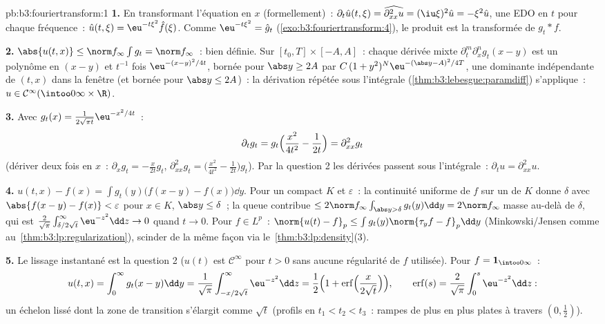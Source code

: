 \begin{solution}{pb:b3:fouriertransform:1}
\textbf{1.} En transformant l'équation en $x$
(formellement)~: $\partial_t\hat u(t,\xi) =
\widehat{\partial^2_{xx}u} = (\iu\xi)^2\hat u = -\xi^2\hat
u$, une EDO en $t$ pour chaque fréquence~: $\hat u(t,\xi) =
\eu^{-t\xi^2}\hat f(\xi)$. Comme $\eu^{-t\xi^2} = \hat g_t$
(\cref{exo:b3:fouriertransform:4}), le produit est la
transformée de $g_t * f$.

\textbf{2.} $\abs{u(t,x)} \leq \norm f_\infty\int g_t = \norm
f_\infty$~: bien définie. Sur $[t_0, T]\times[-A, A]$~: chaque
dérivée mixte $\partial^m_t\partial^n_xg_t(x - y)$ est un
polynôme en $(x - y)$ et $t^{-1}$ fois
$\eu^{-(x-y)^2/4t}$, bornée pour $\abs y \geq 2A$ par
$C\,(1 + y^2)^N\eu^{-(\abs y - A)^2/4T}$, une dominante
 indépendante de $(t, x)$ dans la fenêtre (et
bornée pour $\abs y \leq 2A$)~: la dérivation répétée sous
l'intégrale (\cref{thm:b3:lebesgue:paramdiff}) s'applique~:
$u \in \mathcal C^\infty(\intoo0\infty\times\R)$.

\textbf{3.} Avec $g_t(x) = \frac1{2\sqrt{\pi
t}}\eu^{-x^2/4t}$~:
\[
\partial_tg_t = g_t\Bigl(\frac{x^2}{4t^2} - \frac1{2t}\Bigr)
= \partial^2_{xx}g_t
\]
(dériver deux fois en $x$~: $\partial_xg_t = -\frac
x{2t}g_t$, $\partial^2_{xx}g_t = \bigl(\frac{x^2}{4t^2} -
\frac1{2t}\bigr)g_t$). Par la question 2 les dérivées passent
sous l'intégrale~: $\partial_tu = \partial^2_{xx}u$.

\textbf{4.} $u(t,x) - f(x) = \int g_t(y)\bigl(f(x - y) -
f(x)\bigr)\dd y$. Pour un compact $K$ et $\varepsilon$~: la
continuité uniforme de $f$ sur un  de $K$ donne
$\delta$ avec $\abs{f(x-y) - f(x)} < \varepsilon$ pour $x \in
K$, $\abs y \leq \delta$~; la queue contribue $\leq 2\norm
f_\infty\int_{\abs y > \delta}g_t(y)\dd y = 2\norm
f_\infty\,$masse au-delà de $\delta$, qui est
$\frac2{\sqrt\pi}\int_{\delta/2\sqrt t}^\infty\eu^{-z^2}\dd z
\to 0$ quand $t \to 0$. Pour $f \in L^p$~: $\norm{u(t) - f}_p
\leq \int g_t(y)\norm{\tau_yf - f}_p\dd y$
(Minkowski/Jensen comme au~\cref{thm:b3:lp:regularization}), scinder de la même façon
via le~\cref{thm:b3:lp:density}(3).

\textbf{5.} Le lissage instantané est la question 2 ($u(t)$
est $\mathcal C^\infty$ pour $t > 0$ sans aucune régularité
de $f$ utilisée). Pour $f = \mathbf 1_{\intoo0\infty}$~:
\[
u(t, x) = \int_0^\infty g_t(x - y)\dd y
= \frac1{\sqrt\pi}\int_{-x/2\sqrt t}^{\infty}\eu^{-z^2}\dd z
= \frac12\Bigl(1 +
\operatorname{erf}\Bigl(\frac{x}{2\sqrt t}\Bigr)\Bigr),
\qquad \operatorname{erf}(s) =
\frac2{\sqrt\pi}\int_0^s\eu^{-z^2}\dd z :
\]
un échelon lissé dont la zone de transition s'élargit comme
$\sqrt t$ (profils en $t_1 < t_2 < t_3$~: rampes de plus en
plus plates à travers $(0, \frac12)$).


\end{solution}
